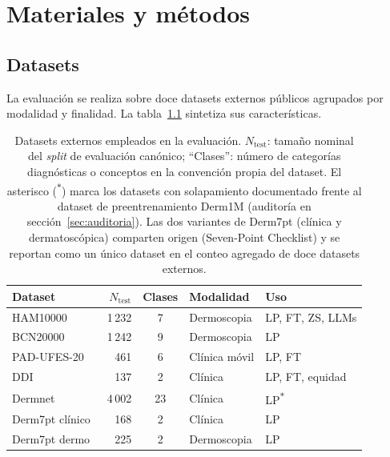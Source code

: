 
\chapter{Materiales y métodos}
\label{cap:metodos}

\section{Datasets}
\label{sec:datos}

La evaluación se realiza sobre doce datasets externos públicos
agrupados por modalidad y finalidad. La
tabla~\ref{tab:datasets-resumen} sintetiza sus características.

\begin{table}[H]
\centering
\footnotesize
\setlength{\tabcolsep}{4pt}
\renewcommand{\arraystretch}{0.95}
\caption{Datasets externos empleados en la evaluación.
$N_{\mathrm{test}}$: tamaño nominal del \emph{split} de evaluación
canónico; ``Clases'': número de categorías diagnósticas o conceptos
en la convención propia del dataset. El asterisco
(\textsuperscript{$\ast$}) marca los datasets con solapamiento
documentado frente al dataset de preentrenamiento Derm1M
(auditoría en secci\'on~\ref{sec:auditoria}). Las dos variantes de Derm7pt
(clínica y dermatoscópica) comparten origen
(Seven-Point Checklist) y se reportan como un único dataset en el
conteo agregado de doce datasets externos.}
\label{tab:datasets-resumen}
\begin{tabular}{lrcll}
\hline
Dataset & $N_{\mathrm{test}}$ & Clases & Modalidad & Uso \\
\hline
HAM10000~\cite{ham10000}             & 1\,232  & 7        & Dermoscopia      & LP, FT, ZS, LLMs \\
BCN20000~\cite{bcn20000}             & 1\,242  & 9        & Dermoscopia      & LP \\
PAD-UFES-20~\cite{padufes}           & 461     & 6        & Clínica móvil    & LP, FT \\
DDI~\cite{ddi}                       & 137     & 2        & Clínica          & LP, FT, equidad \\
Dermnet~\cite{dermnet}               & 4\,002  & 23       & Clínica          & LP\textsuperscript{$\ast$} \\
Derm7pt clínico~\cite{kawahara2019}  & 168     & 2        & Clínica          & LP \\
Derm7pt dermo~\cite{kawahara2019}    & 225     & 2        & Dermoscopia      & LP \\

\end{tabular}
\end{table}
